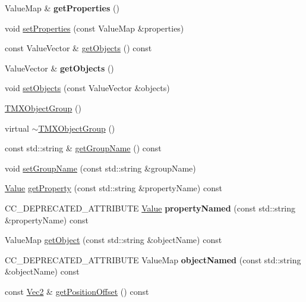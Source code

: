 \begin{DoxyCompactItemize}
Value\+Map \& {\bfseries get\+Properties} ()
\item 
void \hyperlink{classTMXObjectGroup_aefd094cfbf8755171cfc69689910b1de}{set\+Properties} (const Value\+Map \&properties)
\item 
const Value\+Vector \& \hyperlink{classTMXObjectGroup_a643c72fe79aabd06d076597a7f8aeefd}{get\+Objects} () const
\item 
\mbox{\label{classTMXObjectGroup_a82da93c74949ad4ea084e04700ebe050}} 
Value\+Vector \& {\bfseries get\+Objects} ()
\item 
void \hyperlink{classTMXObjectGroup_afa4934557f0adc40d0e8e5c8d269bf5f}{set\+Objects} (const Value\+Vector \&objects)
\item 
\hyperlink{classTMXObjectGroup_a5af0790df4919db796e3a3fdcae72e60}{T\+M\+X\+Object\+Group} ()
\item 
virtual \hyperlink{classTMXObjectGroup_a352df25d2df06b096fd30fb5c83d55d5}{$\sim$\+T\+M\+X\+Object\+Group} ()
\item 
const std\+::string \& \hyperlink{classTMXObjectGroup_a64c2197f8730ebd449086e0c1ee4d3f7}{get\+Group\+Name} () const
\item 
void \hyperlink{classTMXObjectGroup_aafffef23335ae841700cfddde5e6301c}{set\+Group\+Name} (const std\+::string \&group\+Name)
\item 
\hyperlink{classValue}{Value} \hyperlink{classTMXObjectGroup_a8cf30e4dc195b522f044efa6af6b2690}{get\+Property} (const std\+::string \&property\+Name) const
\item 
\mbox{\label{classTMXObjectGroup_aba5477c58f17fe03931f4d62ae86c456}} 
C\+C\+\_\+\+D\+E\+P\+R\+E\+C\+A\+T\+E\+D\+\_\+\+A\+T\+T\+R\+I\+B\+U\+TE \hyperlink{classValue}{Value} {\bfseries property\+Named} (const std\+::string \&property\+Name) const
\item 
Value\+Map \hyperlink{classTMXObjectGroup_adc5371f496124537ac76e97426a8f5db}{get\+Object} (const std\+::string \&object\+Name) const
\item 
\mbox{\label{classTMXObjectGroup_a7de2a7302290f38dae44110d64bf5fff}} 
C\+C\+\_\+\+D\+E\+P\+R\+E\+C\+A\+T\+E\+D\+\_\+\+A\+T\+T\+R\+I\+B\+U\+TE Value\+Map {\bfseries object\+Named} (const std\+::string \&object\+Name) const
\item 
const \hyperlink{classVec2}{Vec2} \& \hyperlink{classTMXObjectGroup_aa11982f548c2a8fe561c882201f82e29}{get\+Position\+Offset} () const

\end{DoxyCompactItemize}
